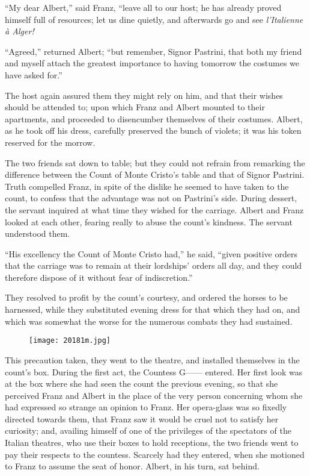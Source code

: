 “My dear Albert,” said Franz, “leave all to our host; he has already
proved himself full of resources; let us dine quietly, and afterwards
go and see \textit{l’Italienne à Alger!}

“Agreed,” returned Albert; “but remember, Signor Pastrini, that both my
friend and myself attach the greatest importance to having tomorrow the
costumes we have asked for.”

The host again assured them they might rely on him, and that their
wishes should be attended to; upon which Franz and Albert mounted to
their apartments, and proceeded to disencumber themselves of their
costumes. Albert, as he took off his dress, carefully preserved the
bunch of violets; it was his token reserved for the morrow.

The two friends sat down to table; but they could not refrain from
remarking the difference between the Count of Monte Cristo’s table and
that of Signor Pastrini. Truth compelled Franz, in spite of the dislike
he seemed to have taken to the count, to confess that the advantage was
not on Pastrini’s side. During dessert, the servant inquired at what
time they wished for the carriage. Albert and Franz looked at each
other, fearing really to abuse the count’s kindness. The servant
understood them.

“His excellency the Count of Monte Cristo had,” he said, “given
positive orders that the carriage was to remain at their lordships’
orders all day, and they could therefore dispose of it without fear of
indiscretion.”

They resolved to profit by the count’s courtesy, and ordered the horses
to be harnessed, while they substituted evening dress for that which
they had on, and which was somewhat the worse for the numerous combats
they had sustained.

\begin{figure}[h]
\texttt{[image: 20181m.jpg]}
\end{figure}

This precaution taken, they went to the theatre, and installed
themselves in the count’s box. During the first act, the Countess G——
entered. Her first look was at the box where she had seen the count the
previous evening, so that she perceived Franz and Albert in the place
of the very person concerning whom she had expressed so strange an
opinion to Franz. Her opera-glass was so fixedly directed towards them,
that Franz saw it would be cruel not to satisfy her curiosity; and,
availing himself of one of the privileges of the spectators of the
Italian theatres, who use their boxes to hold receptions, the two
friends went to pay their respects to the countess. Scarcely had they
entered, when she motioned to Franz to assume the seat of honor.
Albert, in his turn, sat behind.

